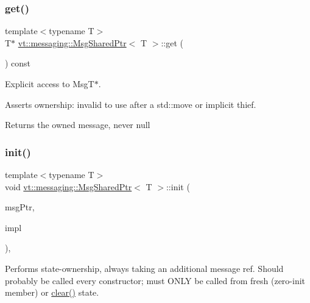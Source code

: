 \subsubsection{\texorpdfstring{get()}{get()}}
{\footnotesize\ttfamily template$<$typename T$>$ \\
T$\ast$ \hyperlink{structvt_1_1messaging_1_1_msg_shared_ptr}{vt\+::messaging\+::\+Msg\+Shared\+Ptr}$<$ T $>$\+::get (\begin{DoxyParamCaption}{ }\end{DoxyParamCaption}) const\hspace{0.3cm}{\ttfamily [inline]}}



Explicit access to Msg\+T$\ast$. 

Asserts ownership\+: invalid to use after a std\+::move or implicit thief.

\begin{DoxyReturn}{Returns}
the owned message, never null 
\end{DoxyReturn}
\mbox{\label{structvt_1_1messaging_1_1_msg_shared_ptr_a7117c1a8364c3267d4694b79a2f5cc6b}} 
\subsubsection{\texorpdfstring{init()}{init()}}
{\footnotesize\ttfamily template$<$typename T$>$ \\
void \hyperlink{structvt_1_1messaging_1_1_msg_shared_ptr}{vt\+::messaging\+::\+Msg\+Shared\+Ptr}$<$ T $>$\+::init (\begin{DoxyParamCaption}\item[{T $\ast$}]{msg\+Ptr,  }\item[{\hyperlink{structvt_1_1messaging_1_1_msg_ptr_impl_base}{Msg\+Ptr\+Impl\+Base} $\ast$}]{impl }\end{DoxyParamCaption})\hspace{0.3cm}{\ttfamily [inline]}, {\ttfamily [private]}}

Performs state-\/ownership, always taking an additional message ref. Should probably be called every constructor; must O\+N\+LY be called from fresh (zero-\/init member) or \hyperlink{structvt_1_1messaging_1_1_msg_shared_ptr_ace4439c8585f3d3c50b861570db07d99}{clear()} state. \mbox{\label{structvt_1_1messaging_1_1_msg_shared_ptr_a351f61999bc2f15ec3027fcb76c9a942}} 
